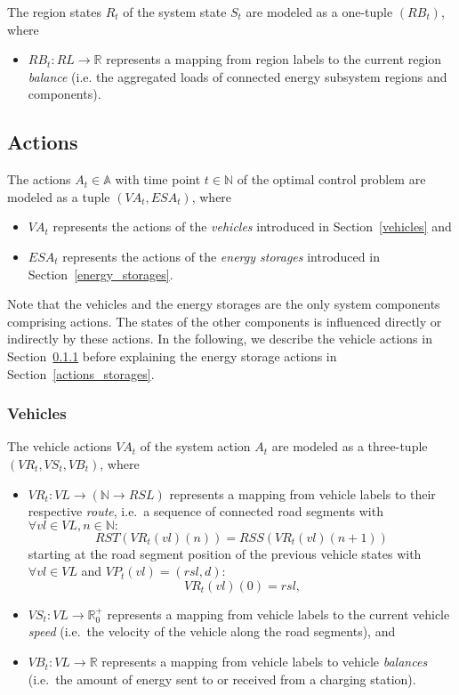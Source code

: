 The region states $R_t$ of the system state $S_t$ are modeled as a one-tuple $(RB_t)$, where
\begin{itemize}
	\item $RB_t: RL \rightarrow \mathbb{R}$ represents a mapping from region labels to the current region \textit{balance} (i.e. the aggregated loads of connected energy subsystem regions and components).
\end{itemize}

\subsection{Actions}
\label{actions}

The actions $A_t \in \mathbb{A}$ with time point $t \in \mathbb{N}$ of the optimal control problem are modeled as a tuple $(VA_t, ESA_t)$, where
\begin{itemize}
	\item $VA_t$ represents the actions of the \textit{vehicles} introduced in Section~\ref{vehicles} and
	\item $ESA_t$ represents the actions of the \textit{energy storages} introduced in Section~\ref{energy_storages}.
\end{itemize}
Note that the vehicles and the energy storages are the only system components comprising actions. The states of the other components is influenced directly or indirectly by these actions. In the following, we describe the vehicle actions in Section~\ref{actions_vehicles} before explaining the energy storage actions in Section~\ref{actions_storages}.

\subsubsection{Vehicles}
\label{actions_vehicles}

The vehicle actions $VA_t$ of the system action $A_t$ are modeled as a three-tuple $(VR_t, VS_t, VB_t)$, where
\begin{itemize}
	\item $VR_t: VL \rightarrow (\mathbb{N} \rightarrow RSL)$ represents a mapping from vehicle labels to their respective \textit{route}, i.e.\ a sequence of connected road segments with $\forall vl \in VL, n \in \mathbb{N}:$
	\[
		RST(VR_t(vl)(n)) = RSS(VR_t(vl)(n + 1))
	\]
	starting at the road segment position of the previous vehicle states with $\forall vl \in VL$ and $VP_t(vl) = (rsl, d):$
	\[
		VR_t(vl)(0) = rsl \textrm{,}
	\]
	\item $VS_t: VL \rightarrow \mathbb{R}_0^+$ represents a mapping from vehicle labels to the current vehicle \textit{speed} (i.e.\ the velocity of the vehicle along the road segments), and
	\item $VB_t: VL \rightarrow \mathbb{R}$ represents a mapping from vehicle labels to vehicle \textit{balances} (i.e.\ the amount of energy sent to or received from a charging station).
\end{itemize}

